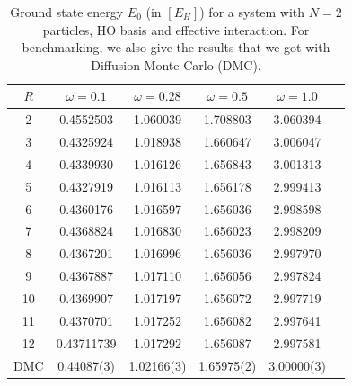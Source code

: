 \begin{table}
\begin{center}
\begin{tabular}{cccccc}
\hline\hline
$R$  & $\omega = 0.1$ & $\omega = 0.28$ & $\omega=0.5$ & $\omega=1.0$ \\
\hline
2  &0.4552503 &1.060039 &1.708803 &3.060394 \\
3  &0.4325924 &1.018938 &1.660647 &3.006047 \\
4  &0.4339930 &1.016126 &1.656843 &3.001313 \\
5  &0.4327919 &1.016113 &1.656178 &2.999413 \\
6  &0.4360176 &1.016597 &1.656036 &2.998598 \\
7  &0.4368824 &1.016830 &1.656023 &2.998209 \\
8  &0.4367201 &1.016996 &1.656036 &2.997970 \\
9  &0.4367887 &1.017110 & 1.656056 &2.997824 \\
10 &0.4369907 &1.017197 &1.656072 &2.997719 \\
11 &0.4370701 &1.017252 &1.656082 &2.997641 \\
12 &0.43711739 &1.017292 &1.656087 &2.997581 \\
\hline
DMC &0.44087(3) &1.02166(3) &1.65975(2) &3.00000(3) \\ %
\hline\hline
\end{tabular}
\end{center}
\caption{Ground state energy $E_0$ (in $\left[E_H\right]$) for a system with $N=2$ particles, HO basis and effective interaction. For benchmarking, we also give the results that we got with Diffusion Monte Carlo (DMC). 
 }
\label{tab:imsrg2-2parteff}
\end{table}


